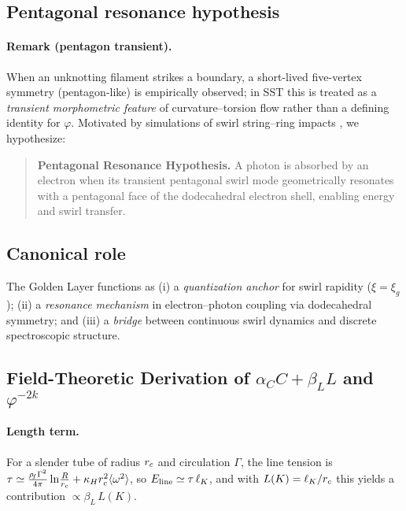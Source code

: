 \subsection{Pentagonal resonance hypothesis}
\paragraph*{Remark (pentagon transient).}
When an unknotting filament strikes a boundary, a short-lived five-vertex symmetry (pentagon-like) is empirically observed; in SST this is treated as a \emph{transient morphometric feature} of curvature–torsion flow rather than a defining identity for \(\varphi\). Motivated by simulations of swirl string–ring impacts \cite{orlandi1993vortex}, we hypothesize:
\begin{quote}
	\textbf{Pentagonal Resonance Hypothesis.}
	A photon is absorbed by an electron when its transient pentagonal swirl mode geometrically resonates with a pentagonal face of the dodecahedral electron shell, enabling energy and swirl transfer.
\end{quote}

\subsection{Canonical role}
The Golden Layer functions as (i) a \emph{quantization anchor} for swirl rapidity (\(\xi=\xi_g\)); (ii) a \emph{resonance mechanism} in electron–photon coupling via dodecahedral symmetry; and (iii) a \emph{bridge} between continuous swirl dynamics and discrete spectroscopic structure.

\subsection{Field-Theoretic Derivation of \texorpdfstring{$\alpha_C C+\beta_{\!L} L$}{alpha_C C + beta_L L} and \texorpdfstring{$\varphi^{-2k}$}{phi^{-2k}}}
\paragraph*{Length term.}
For a slender tube of radius \(r_c\) and circulation \(\Gamma\), the line tension is
\(
\tau\simeq \frac{\rho_{\!f}\Gamma^2}{4\pi}\ln\!\frac{R}{r_c}+\kappa_H r_c^2\langle\omega^2\rangle
\),
so \(E_{\rm line}\simeq \tau\,\ell_K\),
and with \(L(K)=\ell_K/r_c\) this yields a contribution \(\propto \beta_{\!L}\,L(K)\).

